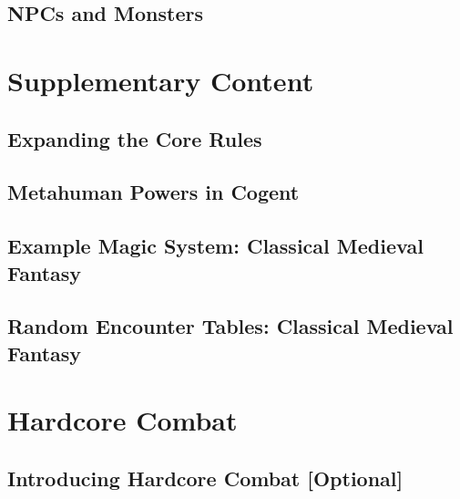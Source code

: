 \newpage
\chapter{NPCs and Monsters} \label{ch:na.nps_and_monsters}


\cleardoublepage
\part{Supplementary Content} \label{part:supplementary}

\newpage
\chapter{Expanding the Core Rules} \label{ch:su.expanding_core_rules}


\newpage
\chapter{Metahuman Powers in Cogent} \label{ch:su.metahuman_powers}


\newpage
\chapter{Example Magic System: Classical Medieval Fantasy} \label{ch:su.classic_fantasy_system}


\newpage
\chapter{Random Encounter Tables: Classical Medieval Fantasy} \label{ch:su.random_encounter_tables}


\cleardoublepage
\part{Hardcore Combat} \label{part:hardcore_combat}

\newpage
\chapter{Introducing Hardcore Combat [Optional]} \label{ch:hc.hardcore_combat}


